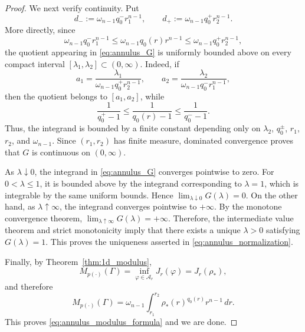 \documentclass[12pt]{amsart}
\numberwithin{equation}{section}
\theoremstyle{plain}
\theoremstyle{definition}
\begin{document}
\begin{proof}
We next verify continuity. Put
\begin{equation*}
d_-
:=
\omega_{n-1}q_0^-r_1^{n-1},
\qquad
d_+
:=
\omega_{n-1}q_0^+r_2^{n-1}.
\end{equation*}
More directly, since
\begin{equation*}
\omega_{n-1}q_0^-r_1^{n-1}
\le
\omega_{n-1}q_0(r)r^{n-1}
\le
\omega_{n-1}q_0^+r_2^{n-1},
\end{equation*}
the quotient appearing in \eqref{eq:annulus_G} is uniformly bounded
above on every compact interval $[\lambda_1,\lambda_2]\subset(0,\infty)$.
Indeed, if
\begin{equation*}
a_1=\frac{\lambda_1}
{\omega_{n-1}q_0^+r_2^{n-1}},
\qquad
a_2=\frac{\lambda_2}
{\omega_{n-1}q_0^-r_1^{n-1}},
\end{equation*}
then the quotient belongs to $[a_1,a_2]$, while
\begin{equation*}
\frac{1}{q_0^+-1}
\le
\frac{1}{q_0(r)-1}
\le
\frac{1}{q_0^--1}.
\end{equation*}
Thus, the integrand is bounded by a finite constant depending only on
$\lambda_2$, $q_0^\pm$, $r_1$, $r_2$, and $\omega_{n-1}$. Since
$(r_1,r_2)$ has finite measure, dominated convergence proves that
$G$ is continuous on $(0,\infty)$.

As $\lambda\downarrow0$, the integrand in \eqref{eq:annulus_G}
converges pointwise to zero. For $0<\lambda\le1$, it is bounded above by
the integrand corresponding to $\lambda=1$, which is integrable by the
same uniform bounds. Hence
$\lim_{\lambda\downarrow0}G(\lambda)=0.$
On the other hand, as $\lambda\uparrow\infty$, the integrand converges
pointwise to $+\infty$. By the monotone convergence theorem,
$\lim_{\lambda\uparrow\infty}G(\lambda)=+\infty.$
Therefore, the intermediate value theorem and strict monotonicity imply
that there exists a unique $\lambda>0$ satisfying $G(\lambda)=1$.
This proves the uniqueness asserted in \eqref{eq:annulus_normalization}.

Finally, by Theorem~\ref{thm:1d_modulus},
\begin{equation*}
M_{p(\cdot)}(\Gamma)
=
\inf_{\varphi\in\mathcal A_r}J_r(\varphi)
=
J_r(\rho_*),
\end{equation*}
and therefore
\begin{equation*}
M_{p(\cdot)}(\Gamma)
=
\omega_{n-1}
\int_{r_1}^{r_2}
\rho_*(r)^{q_0(r)}r^{n-1}\,dr.
\end{equation*}
This proves \eqref{eq:annulus_modulus_formula} and we are done.
\end{proof}
\end{document}
